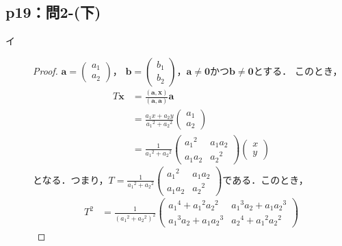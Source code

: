 \documentclass[uplatex,dvipdfmx,a4paper,11pt,fleqn]{jsarticle}
\begin{document}
\subsection*{p19：問2-(下)}
\begin{leftbar}
\begin{description}
    \item[イ] 
    \begin{proof}
    $\bm{a}=
        \begin{pmatrix}
            a_1 \\
            a_2
        \end{pmatrix}
    $，
    $\bm{b}=
        \begin{pmatrix}
            b_1 \\
            b_2
        \end{pmatrix}
    $，$\bm{a} \ne \bm{0}$かつ$\bm{b} \ne \bm{0}$とする．
    このとき，
    \begin{align*}
        T \bm{x} &=\frac{(\bm{a},\bm{x})}{(\bm{a},\bm{a})} \bm{a} \\
        & = \frac{a_1 x + a_2 y}{{a_1}^2+{a_2}^2} 
        \begin{pmatrix}
            a_1 \\
            a_2
        \end{pmatrix}
        \\
        & =
        \frac{1}{{a_1}^2+{a_2}^2}
        \begin{pmatrix}
            {a_1}^2 & a_1 a_2 \\
            a_1 a_2 & {a_2}^2
        \end{pmatrix}
        \begin{pmatrix}
            x \\
            y
        \end{pmatrix}
    \end{align*}
    となる．つまり，$T=\frac{1}{{a_1}^2+{a_2}^2}
    \begin{pmatrix}
        {a_1}^2 & a_1 a_2 \\
        a_1 a_2 & {a_2}^2
    \end{pmatrix}
    $である．このとき，
    \begin{align*}
        T^2 &= \frac{1}{({a_1}^2+{a_2}^2)^2}
        \begin{pmatrix}
            {a_1}^4 + {a_1}^2 {a_2}^2 & {a_1}^3 a_2 + a_1 {a_2}^3 \\
            {a_1}^3 a_2 + a_1 {a_2}^3 & {a_2}^4 + {a_1}^2 {a_2}^2

\end{pmatrix}
\end{align*}
\end{proof}
\end{description}
\end{leftbar}
\end{document}
